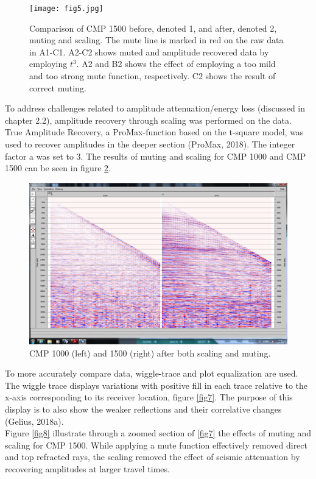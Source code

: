 \documentclass[10pt,a4paper]{article}
\begin{document}
\begin{figure}[H]
\texttt{[image: fig5.jpg]}
\caption{Comparison of CMP 1500 before, denoted 1, and after, denoted 2, muting and scaling. The mute line is marked in red on the raw data in A1-C1. A2-C2 shows muted and amplitude recovered data by employing $t^3$. A2 and B2 shows the effect of employing a too mild and too strong mute function, respectively. C2 shows the result of correct muting.}
\label{fig5}
\end{figure}


\noindent To address challenges related to amplitude attenuation/energy loss (discussed in chapter 2.2), amplitude recovery through scaling was performed on the data. True Amplitude Recovery, a ProMax-function based on the t-square model, was used to recover amplitudes in the deeper section (ProMax, 2018). The integer factor a was set to 3. The results of muting and scaling for CMP 1000 and CMP 1500 can be seen in figure \ref{fig6}.  

\begin{figure}[H]
\includegraphics[width=\textwidth, trim={1.5cm 1.5cm 1cm 1.5cm},clip]{fig6.jpg}
\caption{CMP 1000 (left) and 1500 (right) after both scaling and muting.}
\label{fig6}
\end{figure}

\noindent To more accurately compare data, wiggle-trace and plot equalization are used. The wiggle trace displays variations with positive fill in each trace relative to the x-axis corresponding to its receiver location, figure \ref{fig7}. 
The purpose of this display is to also show the weaker reflections and their correlative changes (Gelius, 2018a). 
\\
Figure \ref{fig8} illustrate through a zoomed section of \ref{fig7} the effects of muting and scaling for CMP 1500. While applying a mute function effectively removed direct and top refracted rays, the scaling removed the effect of seismic attenuation by recovering amplitudes at larger travel times. 
\end{document}
